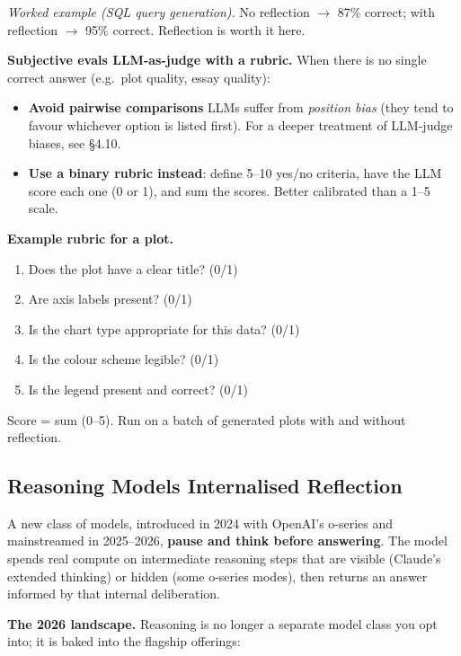 \documentclass[a4paper,11pt]{article}
\begin{document}
\textit{Worked example (SQL query generation).} No reflection $\to$
87\% correct; with reflection $\to$ 95\% correct. Reflection is worth
it here.

\textbf{Subjective evals \textemdash{} LLM-as-judge with a rubric.}
When there is no single correct answer (e.g.\ plot quality, essay
quality):

\begin{itemize}[noitemsep, leftmargin=1.2em]
  \item \textbf{Avoid pairwise comparisons} \textemdash{} LLMs suffer
        from \textit{position bias} (they tend to favour whichever
        option is listed first). For a deeper treatment of LLM-judge
        biases, see §4.10.
  \item \textbf{Use a binary rubric instead}: define 5–10 yes/no
        criteria, have the LLM score each one (0 or 1), and sum the
        scores. Better calibrated than a 1–5 scale.
\end{itemize}

\textbf{Example rubric for a plot.}
\begin{enumerate}[noitemsep, leftmargin=1.4em]
  \item Does the plot have a clear title? (0/1)
  \item Are axis labels present? (0/1)
  \item Is the chart type appropriate for this data? (0/1)
  \item Is the colour scheme legible? (0/1)
  \item Is the legend present and correct? (0/1)
\end{enumerate}
Score = sum (0–5). Run on a batch of generated plots with and without
reflection.

\subsection{Reasoning Models \textemdash{} Internalised Reflection}

A new class of models, introduced in 2024 with OpenAI's o-series and
mainstreamed in 2025–2026, \textbf{pause and think before answering}.
The model spends real compute on intermediate reasoning steps that
are visible (Claude's extended thinking) or hidden (some o-series
modes), then returns an answer informed by that internal deliberation.

\textbf{The 2026 landscape.} Reasoning is no longer a separate model
class you opt into; it is baked into the flagship offerings:
\end{document}
